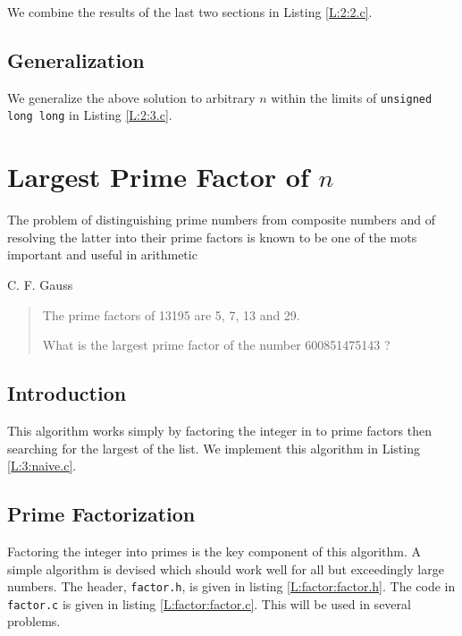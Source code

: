\documentclass[oneside,12pt]{book}   	%
\newcounter{ex}
\newcounter{pr}
\theoremstyle{definition}
\begin{document}
\begin{spacing}{1.618}
		We combine the results of the last two sections in Listing \ref{L:2:2.c}. 
	
		

	\section{Generalization}
	
		We generalize the above solution to arbitrary $n$ within the limits of \texttt{unsigned long long} in Listing \ref{L:2:3.c}. 
		
		

	\chapter{Largest Prime Factor of $n$}
		\epigraph{The problem of distinguishing prime numbers from composite numbers and of resolving the latter into their prime factors is known to be one of the mots important and useful in arithmetic}{C. F. Gauss}
		\begin{quote}
			The prime factors of 13195 are 5, 7, 13 and 29.

			What is the largest prime factor of the number 600851475143 ?
		\end{quote}
	
		\section{Introduction}
			This algorithm works simply by factoring the integer in to prime factors then searching for the largest of the list.  We implement this algorithm in Listing \ref{L:3:naive.c}. 
			
			
		
		\section{Prime Factorization}
		
			Factoring the integer into primes is the key component of this algorithm. A simple algorithm is devised which should work well for all but exceedingly large numbers. The header, \texttt{factor.h}, is given in listing \ref{L:factor:factor.h}.  The code in \texttt{factor.c} is given in listing \ref{L:factor:factor.c}. This will be used in several problems. 
		

\end{spacing}
\end{document}
